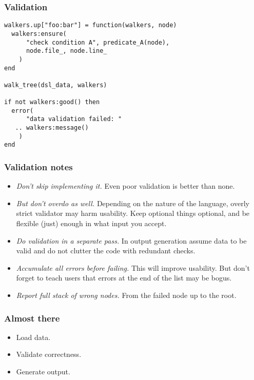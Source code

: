 \documentclass[handout]{beamer}
\begin{document}

\begin{frame}[fragile]

\frametitle{Validation}

\begin{verbatim}
walkers.up["foo:bar"] = function(walkers, node)
  walkers:ensure(
      "check condition A", predicate_A(node),
      node.file_, node.line_
    )
end

walk_tree(dsl_data, walkers)

if not walkers:good() then
  error(
      "data validation failed: "
   .. walkers:message()
    )
end
\end{verbatim}

\end{frame}


\begin{frame}

\frametitle{Validation notes}

\begin{itemize}
\item \emph{Don't skip implementing it.} Even poor validation is better than none.
\pause
\item \emph{But don't overdo as well.} Depending on the nature of the language, overly strict validator may harm usability. Keep optional things optional, and be flexible (just) enough in what input you accept.
\pause
\item \emph{Do validation in a separate pass.} In output generation assume data to be valid and do not clutter the code with redundant checks.
\pause
\item \emph{Accumulate all errors before failing.} This will improve usability. But don't forget to teach users that errors at the end of the list may be bogus.
\item \emph{Report full stack of wrong nodes.} From the failed node up to the root.
\end{itemize}

\end{frame}


\begin{frame}

\frametitle{Almost there}

\begin{itemize}
\item[\checkmark] Load data.
\item[\checkmark] Validate correctness.
\item Generate output.
\end{itemize}

\end{frame}
\end{document}
